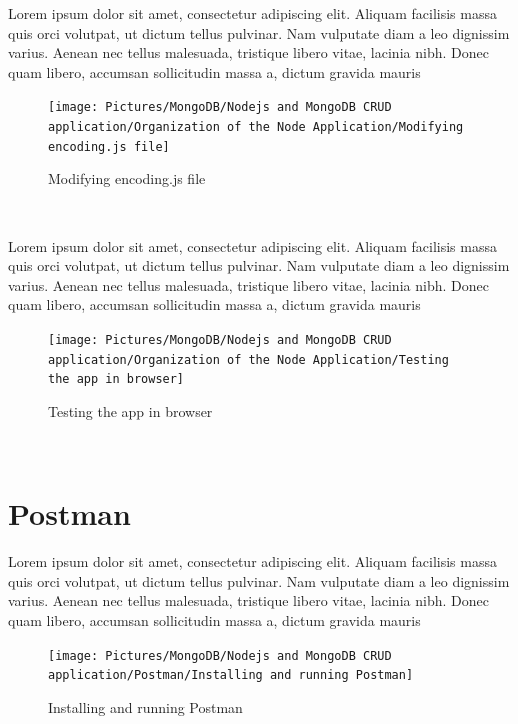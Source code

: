 \begin{spacing}{1.2}
\par Lorem ipsum dolor sit amet, consectetur adipiscing elit. Aliquam facilisis massa quis orci volutpat, ut dictum tellus pulvinar. Nam vulputate diam a leo dignissim varius. Aenean nec tellus malesuada, tristique libero vitae, lacinia nibh. Donec quam libero, accumsan sollicitudin massa a, dictum gravida mauris
\\
\begin{figure}[!htb] 
\begin{center} 
\texttt{[image: Pictures/MongoDB/Nodejs and MongoDB CRUD  application/Organization of the Node Application/Modifying encoding.js file]} 
\end{center} 
\caption{Modifying encoding.js file} 
\end{figure}  \FloatBarrier
\\

\par Lorem ipsum dolor sit amet, consectetur adipiscing elit. Aliquam facilisis massa quis orci volutpat, ut dictum tellus pulvinar. Nam vulputate diam a leo dignissim varius. Aenean nec tellus malesuada, tristique libero vitae, lacinia nibh. Donec quam libero, accumsan sollicitudin massa a, dictum gravida mauris
\\
\begin{figure}[!htb] 
\begin{center} 
\texttt{[image: Pictures/MongoDB/Nodejs and MongoDB CRUD  application/Organization of the Node Application/Testing the app in browser]} 
\end{center} 
\caption{Testing the app in browser} 
\end{figure}  \FloatBarrier
\\
\section{Postman }
\par Lorem ipsum dolor sit amet, consectetur adipiscing elit. Aliquam facilisis massa quis orci volutpat, ut dictum tellus pulvinar. Nam vulputate diam a leo dignissim varius. Aenean nec tellus malesuada, tristique libero vitae, lacinia nibh. Donec quam libero, accumsan sollicitudin massa a, dictum gravida mauris
\\
\begin{figure}[!htb] 
\begin{center} 
\texttt{[image: Pictures/MongoDB/Nodejs and MongoDB CRUD  application/Postman/Installing and running Postman]} 
\end{center} 
\caption{Installing and running Postman} 
\end{figure}  \FloatBarrier
\\


\end{spacing}
